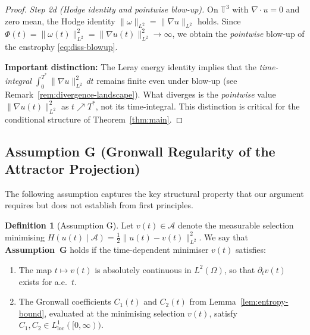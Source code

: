 \documentclass[12pt,a4paper]{article}
\theoremstyle{definition}
\newtheorem{definition}{Definition}[section]
\theoremstyle{plain}
\theoremstyle{remark}
\begin{document}
\begin{proof}
\smallskip
\noindent\emph{Step 2d (Hodge identity and pointwise blow-up).}
On $\mathbb{T}^3$ with $\nabla\cdot u = 0$ and zero mean, the Hodge identity
$\|\omega\|_{L^2} = \|\nabla u\|_{L^2}$ holds.
Since $\Phi(t) = \|\omega(t)\|_{L^2}^2 = \|\nabla u(t)\|_{L^2}^2 \to \infty$,
we obtain the \emph{pointwise} blow-up of the enstrophy
\eqref{eq:diss-blowup}.

\medskip
\noindent\textbf{Important distinction:}\;
The Leray energy identity implies that the \emph{time-integral}
$\int_0^{T^*}\|\nabla u\|_{L^2}^2\,dt$ remains finite even under
blow-up (see Remark~\ref{rem:divergence-landscape}).  What diverges
is the \emph{pointwise} value $\|\nabla u(t)\|_{L^2}^2$ as
$t \nearrow T^*$, not its time-integral.  This distinction is
critical for the conditional structure of Theorem~\ref{thm:main}.
\end{proof}

\subsection*{Assumption G (Gronwall Regularity of the Attractor Projection)}
\label{sec:assumption-G}

The following assumption captures the key structural property that our
argument requires but does not establish from first principles.

\begin{definition}[Assumption G]\label{ass:G}
Let $v(t) \in \mathcal{A}$ denote the measurable selection minimising
$H(u(t)\mid\mathcal{A}) = \tfrac{1}{2}\|u(t)-v(t)\|_{L^2}^2$.  We say that
\textbf{Assumption~G} holds if the time-dependent minimiser $v(t)$ satisfies:
\begin{enumerate}
    \item[\emph{(G1)}] The map $t \mapsto v(t)$ is absolutely continuous in
          $L^2(\Omega)$, so that $\partial_t v(t)$ exists for a.e.\ $t$.
    \item[\emph{(G2)}] The Gronwall coefficients $C_1(t)$ and $C_2(t)$ from
          Lemma~\ref{lem:entropy-bound}, evaluated at the minimising selection
          $v(t)$, satisfy $C_1, C_2 \in L^1_{\mathrm{loc}}([0,\infty))$.
\end{enumerate}
\end{definition}
\end{document}

